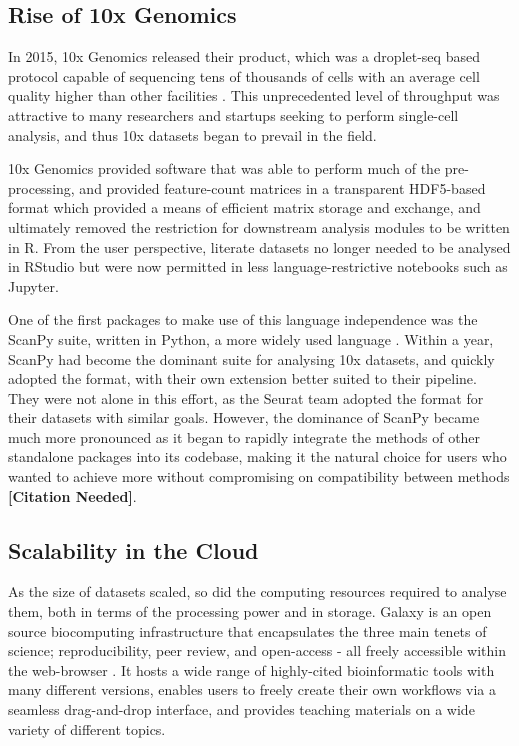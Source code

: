 \documentclass[a4paper,num-refs]{oup-contemporary}
\newcommand{\citeneed}{{\bf\tiny [Citation Needed]}}
\begin{document}

\subsection{Rise of 10x Genomics}
In 2015, 10x Genomics released their  product, which was a droplet-seq based protocol capable of sequencing tens of thousands of cells with an average cell quality higher than other facilities \citep{vickovic2016massive}. This unprecedented level of throughput was attractive to many researchers and startups seeking to perform single-cell analysis, and thus 10x datasets began to prevail in the field.

10x Genomics provided software that was able to perform much of the pre-processing, and provided feature-count matrices in a transparent HDF5-based format which provided a means of efficient matrix storage and exchange, and ultimately removed the restriction for downstream analysis modules to be written in R. From the user perspective, literate datasets no longer needed to be analysed in RStudio but were now permitted in less language-restrictive notebooks such as Jupyter\citep{allaire2012rstudio,kluyver2016jupyter}.

One of the first packages to make use of this language independence was the ScanPy suite, written in Python, a more widely used language \citep{stackoverflow2019,wolf2018scanpy}. Within a year, ScanPy had become the dominant suite for analysing 10x datasets, and quickly adopted the  format, with their own  extension better suited to their pipeline. They were not alone in this effort, as the Seurat team adopted the  format for their datasets with similar goals. However, the dominance of ScanPy became much more pronounced as it began to rapidly integrate the methods of other standalone packages into its codebase, making it the natural choice for users who wanted to achieve more without compromising on compatibility between methods \citeneed.

\subsection{Scalability in the Cloud}

As the size of datasets scaled, so did the computing resources required to analyse them, both in terms of the processing power and in storage. Galaxy is an open source biocomputing infrastructure that encapsulates the three main tenets of science; reproducibility, peer review, and open-access - all freely accessible within the web-browser \citep{afgan2016galaxy}. It hosts a wide range of highly-cited bioinformatic tools with many different versions, enables users to freely create their own workflows via a seamless drag-and-drop interface, and provides teaching materials on a wide variety of different topics.
\end{document}
